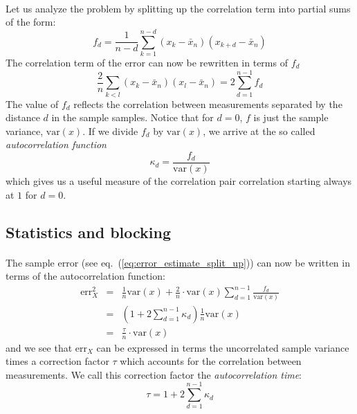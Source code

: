 \documentclass[%
twoside,                 %
final,                   %
10pt]{article}
\begin{document}
\paragraph{}
Let us analyze the problem by splitting up the correlation term into
partial sums of the form:
\[
f_d = \frac{1}{n-d}\sum_{k=1}^{n-d}(x_k - \bar x_n)(x_{k+d} - \bar x_n)
\]
The correlation term of the error can now be rewritten in terms of
$f_d$
\[
\frac{2}{n}\sum_{k<l} (x_k - \bar x_n)(x_l - \bar x_n) =
2\sum_{d=1}^{n-1} f_d
\]
The value of $f_d$ reflects the correlation between measurements
separated by the distance $d$ in the sample samples.  Notice that for
$d=0$, $f$ is just the sample variance, $\mathrm{var}(x)$. If we divide $f_d$
by $\mathrm{var}(x)$, we arrive at the so called \emph{autocorrelation function}
\[
\kappa_d = \frac{f_d}{\mathrm{var}(x)}
\]
which gives us a useful measure of the correlation pair correlation
starting always at $1$ for $d=0$.




\subsection{Statistics and blocking}

\paragraph{}
The sample error (see eq.~(\ref{eq:error_estimate_split_up})) can now be
written in terms of the autocorrelation function:
\begin{eqnarray}
\mathrm{err}_X^2 &=&
\frac{1}{n}\mathrm{var}(x)+\frac{2}{n}\cdot\mathrm{var}(x)\sum_{d=1}^{n-1}
\frac{f_d}{\mathrm{var}(x)}\nonumber\\ &=&
\left(1+2\sum_{d=1}^{n-1}\kappa_d\right)\frac{1}{n}\mathrm{var}(x)\nonumber\\
&=&\frac{\tau}{n}\cdot\mathrm{var}(x)
\label{eq:error_estimate_corr_time}
\end{eqnarray}
and we see that $\mathrm{err}_X$ can be expressed in terms the
uncorrelated sample variance times a correction factor $\tau$ which
accounts for the correlation between measurements. We call this
correction factor the \emph{autocorrelation time}:
\begin{equation}
\tau = 1+2\sum_{d=1}^{n-1}\kappa_d
\label{eq:autocorrelation_time}
\end{equation}
\end{document}
